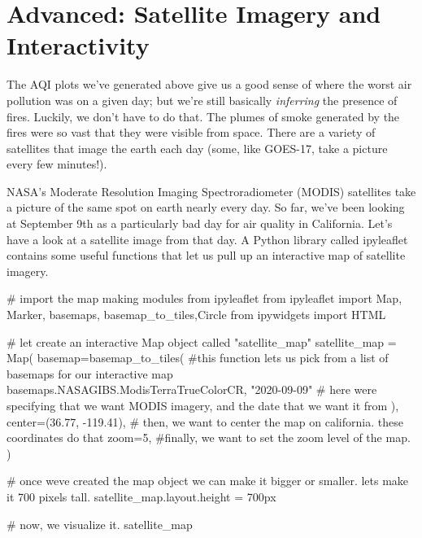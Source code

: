 \documentclass[
  letterpaper,
  DIV=11,
  numbers=noendperiod]{scrreprt}
\newenvironment{Shaded}{\begin{snugshade}}{\end{snugshade}}
\newcommand{\CommentTok}[1]{\textcolor[rgb]{0.37,0.37,0.37}{#1}}
\newcommand{\DecValTok}[1]{\textcolor[rgb]{0.68,0.00,0.00}{#1}}
\newcommand{\FloatTok}[1]{\textcolor[rgb]{0.68,0.00,0.00}{#1}}
\newcommand{\ImportTok}[1]{\textcolor[rgb]{0.00,0.46,0.62}{#1}}
\newcommand{\NormalTok}[1]{\textcolor[rgb]{0.00,0.23,0.31}{#1}}
\newcommand{\OperatorTok}[1]{\textcolor[rgb]{0.37,0.37,0.37}{#1}}
\newcommand{\StringTok}[1]{\textcolor[rgb]{0.13,0.47,0.30}{#1}}
\begin{document}
\hypertarget{advanced-satellite-imagery-and-interactivity}{%
\section{Advanced: Satellite Imagery and
Interactivity}\label{advanced-satellite-imagery-and-interactivity}}

The AQI plots we've generated above give us a good sense of where the
worst air pollution was on a given day; but we're still basically
\emph{inferring} the presence of fires. Luckily, we don't have to do
that. The plumes of smoke generated by the fires were so vast that they
were visible from space. There are a variety of satellites that image
the earth each day (some, like GOES-17, take a picture every few
minutes!).

NASA's Moderate Resolution Imaging Spectroradiometer (MODIS) satellites
take a picture of the same spot on earth nearly every day. So far, we've
been looking at September 9th as a particularly bad day for air quality
in California. Let's have a look at a satellite image from that day. A
Python library called ipyleaflet contains some useful functions that let
us pull up an interactive map of satellite imagery.

\begin{Shaded}
\begin{Highlighting}[]
\CommentTok{\# import the map making modules from ipyleaflet}
\ImportTok{from}\NormalTok{ ipyleaflet }\ImportTok{import}\NormalTok{ Map, Marker, basemaps, basemap\_to\_tiles,Circle}
\ImportTok{from}\NormalTok{ ipywidgets }\ImportTok{import}\NormalTok{ HTML}

\CommentTok{\# let create an interactive Map object called "satellite\_map"}
\NormalTok{satellite\_map }\OperatorTok{=}\NormalTok{ Map(}
\NormalTok{  basemap}\OperatorTok{=}\NormalTok{basemap\_to\_tiles( }\CommentTok{\#this function lets us pick from a list of basemaps for our interactive map}
\NormalTok{    basemaps.NASAGIBS.ModisTerraTrueColorCR, }\StringTok{"2020{-}09{-}09"} \CommentTok{\# here we\textquotesingle{}re specifying that we want MODIS imagery, and the date that we want it from  }
\NormalTok{  ),}
\NormalTok{  center}\OperatorTok{=}\NormalTok{(}\FloatTok{36.77}\NormalTok{, }\OperatorTok{{-}}\FloatTok{119.41}\NormalTok{), }\CommentTok{\# then, we want to center the map on california. these coordinates do that}
\NormalTok{  zoom}\OperatorTok{=}\DecValTok{5}\NormalTok{, }\CommentTok{\#finally, we want to set the zoom level of the map. }
\NormalTok{)}

\CommentTok{\# once we\textquotesingle{}ve created the map object we can make it bigger or smaller. let\textquotesingle{}s make it 700 pixels tall. }
\NormalTok{satellite\_map.layout.height }\OperatorTok{=} \StringTok{\textquotesingle{}700px\textquotesingle{}}

\CommentTok{\# now, we visualize it.}
\NormalTok{satellite\_map}
\end{Highlighting}
\end{Shaded}
\end{document}
